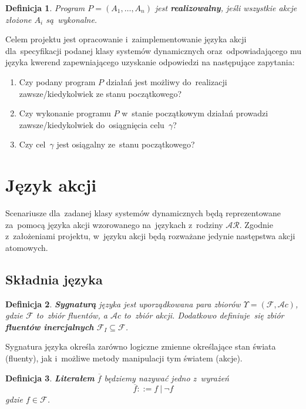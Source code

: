 \documentclass[11pt,a4paper]{article}
\newtheorem{defn}{Definicja}
\begin{document}
\begin{defn}
    Program $P = (A_1, \dots, A_n)$ jest \textbf{realizowalny}, jeśli wszystkie akcje złożone $A_i$ są~wykonalne.
\end{defn}

Celem projektu jest opracowanie i~zaimplementowanie języka akcji dla~specyfikacji podanej klasy systemów dynamicznych oraz~odpowiadającego mu języka kwerend zapewniającego uzyskanie odpowiedzi na następujące zapytania:

\begin{enumerate}
    \item Czy podany program $P$ działań jest możliwy do~realizacji zawsze/kiedykolwiek ze stanu początkowego?
    \item Czy wykonanie programu $P$ w~stanie początkowym działań prowadzi zawsze/kiedykolwiek do~osiągnięcia celu~$\gamma$?
    \item Czy cel~$\gamma$ jest osiągalny ze~stanu początkowego?
\end{enumerate}

\section{Język akcji}

Scenariusze dla~zadanej klasy systemów dynamicznych będą reprezentowane za~pomocą języka akcji wzorowanego na~językach z~rodziny $\mathcal{AR}$.
Zgodnie z~założeniami projektu, w~języku akcji będą rozważane jedynie następstwa akcji atomowych.

\subsection{Składnia języka}
\label{subsec:action-syntax}

\begin{defn}
    \textbf{Sygnaturą} języka jest uporządkowana para zbiorów $\Upsilon = (\mathcal{F}, \mathcal{A}c)$, gdzie $\mathcal{F}$ to~zbiór fluentów, a $ \mathcal{A}c$ to~zbiór akcji.
    Dodatkowo definiuje~się zbiór \textbf{fluentów inercjalnych} $\mathcal{F}_I \subseteq \mathcal{F}$.
\end{defn}

Sygnatura języka określa zarówno logiczne zmienne określające stan świata (fluenty), jak i~możliwe metody manipulacji tym światem (akcje).

\begin{defn}
    \textbf{Literałem} $\overline{f}$ będziemy nazywać jedno z~wyrażeń
    $$ \overline{f} ::= f\ |\ \neg f $$
    gdzie $f \in \mathcal{F}$.
\end{defn}
\end{document}
